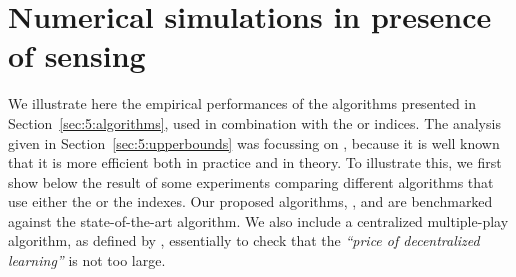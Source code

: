 \section{Numerical simulations in presence of sensing}
\label{sec:5:experiments}






We illustrate here the empirical performances of the algorithms presented in Section~\ref{sec:5:algorithms}, used in combination with the \UCB{} or \klUCB{} indices.
The analysis given in Section~\ref{sec:5:upperbounds} was focussing on \klUCB, because it is well known that it is more efficient both in practice and in theory.
To illustrate this, we first show below the result of some experiments comparing different algorithms that use either the \UCB{} or the \klUCB{} indexes.
%
Our proposed algorithms, \MCTopM{}, \RandTopM{} and \Selfish{} are benchmarked against the state-of-the-art \RhoRand{} algorithm.
We also include a centralized multiple-play \klUCB{} algorithm,
as defined by \cite{Anantharam87a},
essentially to check that the \emph{``price of decentralized learning''} is not too large.

